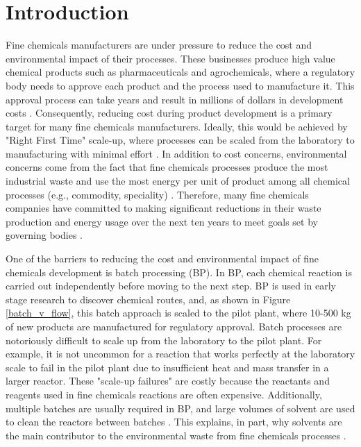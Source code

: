 \chapter{Introduction}\label{ch:introduction}

Fine chemicals manufacturers are under pressure to reduce the cost and environmental impact of their processes. These businesses produce high value chemical products such as pharmaceuticals and agrochemicals, where a regulatory body needs to approve each product and the process used to manufacture it. This approval process can take years and result in millions of dollars in development costs \cite{Prasad2017}. Consequently, reducing cost during product development is a primary target for many fine chemicals manufacturers. Ideally, this would be achieved by "Right First Time" scale-up, where processes can be scaled from the laboratory to manufacturing with minimal effort \cite{Poechlauer2013}. In addition to cost concerns, environmental concerns come from the fact that fine chemicals processes produce the most industrial waste and use the most energy per unit of product among all chemical processes (e.g., commodity, speciality) \cite{Sheldon2018}. Therefore, many fine chemicals companies have committed to making significant reductions in their waste production and energy usage over the next ten years to meet goals set by governing bodies \cite{BASF2020}.

One of the barriers to reducing the cost and environmental impact of fine chemicals development is batch processing (BP).  In BP, each chemical reaction is carried out independently before moving to the next step. BP is used in early stage research to discover chemical routes, and, as shown in Figure \ref{batch_v_flow}, this batch approach is scaled to the pilot plant, where 10-500 kg of new products are manufactured for regulatory approval. Batch processes are notoriously difficult to scale up from the laboratory to the pilot plant. For example, it is not uncommon for a reaction that works perfectly at the laboratory scale to fail in the pilot plant due to insufficient heat and mass transfer in a larger reactor. These "scale-up failures" are costly because the reactants and reagents used in fine chemicals reactions are often expensive. Additionally, multiple batches are usually required in BP, and large volumes of solvent are used to clean the reactors between batches \cite{Lee2016, Sheldon2018}. This explains, in part, why solvents are the main contributor to the environmental waste from fine chemicals processes \cite{Rogers2019}.

